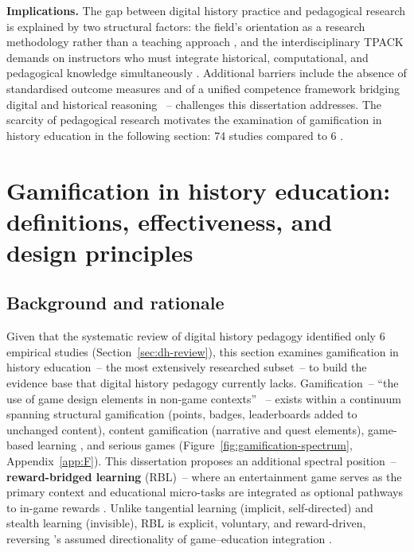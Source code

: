 \textbf{Implications.} The gap between digital history practice and pedagogical research is explained by two structural factors: the field's orientation as a research methodology rather than a teaching approach \cite{Graham20151, Crymble2021, CohenRosenzweig2006}, and the interdisciplinary TPACK demands on instructors who must integrate historical, computational, and pedagogical knowledge simultaneously \cite{Mishra2006, Bordalejo2025, Lucchesi2019}. Additional barriers include the absence of standardised outcome measures \cite{Hattie2009, MonteSano2012} and of a unified competence framework bridging digital and historical reasoning \cite{Wineburg2001, Vuorikari2016}~-- challenges this dissertation addresses. The scarcity of pedagogical research motivates the examination of gamification in history education in the following section: 74 studies compared to 6 \cite{KorniienkoSemerikov2024, DichevDicheva2017}.

\section{Gamification in history education: definitions, effectiveness, and design principles} \label{sec:gamification-review}

\subsection{Background and rationale}

Given that the systematic review of digital history pedagogy identified only 6 empirical studies (Section~\ref{sec:dh-review}), this section examines gamification in history education~-- the most extensively researched subset~-- to build the evidence base that digital history pedagogy currently lacks. Gamification~-- ``the use of game design elements in non-game contexts'' \cite{Deterding2011}~-- exists within a continuum spanning structural gamification (points, badges, leaderboards added to unchanged content), content gamification (narrative and quest elements), game-based learning \cite{Connolly2012, Prensky2001}, and serious games \cite{SEABORN201514} (Figure~\ref{fig:gamification-spectrum}, Appendix~\ref{app:F}). This dissertation proposes an additional spectral position~-- \textbf{reward-bridged learning} (RBL)~-- where an entertainment game serves as the primary context and educational micro-tasks are integrated as optional pathways to in-game rewards \cite{RBL2025}. Unlike tangential learning \cite{frith2021} (implicit, self-directed) and stealth learning \cite{ShuteFormative2008} (invisible), RBL is explicit, voluntary, and reward-driven, reversing \citeauthor{Deterding2011}'s assumed directionality of game--education integration \cite{12Gilbert2019108}.

